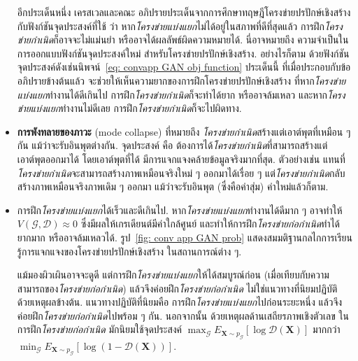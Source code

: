 \begin{itemize}
อีกประเด็นหนึ่ง 
เครสเวลและคณะ\cite{OverviewGAN2018} อภิปรายประเด็นจากการศึกษาทฤษฎีโครงข่ายปรปักษ์เชิงสร้าง\cite{GoodfellowEtAl2014a}
กับฟังก์ชันจุดประสงค์ที่ใช้
ว่า หาก\textit{โครงข่ายแบ่งแยก}ไม่ได้อยู่ในสภาพที่ดีที่สุดแล้ว การฝึก\textit{โครงข่ายกำเนิด}ก็อาจจะไม่แม่นยำ หรืออาจได้ผลลัพธ์ผิดความหมายได้.
นี่อาจหมายถึง ความจำเป็นในการออกแบบฟังก์ชันจุดประสงค์ใหม่ สำหรับโครงข่ายปรปักษ์เชิงสร้าง.
อย่างไรก็ตาม ด้วยฟังก์ชันจุดประสงค์ดังเช่นนิพจน์~\ref{eq: convapp GAN obj function}
ประเด็นนี้ ที่เมื่อประกอบกับข้ออภิปรายข้างต้นแล้ว จะช่วยให้เห็นความยากของการฝึกโครงข่ายปรปักษ์เชิงสร้าง
ที่หาก\textit{โครงข่ายแบ่งแยก}ทำงานได้ดีเกินไป การฝึก\textit{โครงข่ายกำเนิด}ก็จะทำได้ยาก หรืออาจล้มเหลว
และหาก\textit{โครงข่ายแบ่งแยก}ทำงานไม่ดีเลย การฝึก\textit{โครงข่ายกำเนิด}ก็จะไปผิดทาง.



\item \textbf{การพังทลายของภาวะ} (mode collapse\cite{SalimansEtAl2016})
ที่หมายถึง \textit{โครงข่ายกำเนิด}สร้างแต่เอาต์พุตที่เหมือน ๆ กัน แม้ว่าจะรับอินพุตต่างกัน.
จุดประสงค์ คือ ต้องการได้\textit{โครงข่ายกำเนิด}ที่สามารถสร้างแต่เอาต์พุตออกมาได้ โดยเอาต์พุตที่ได้ มีการแจกแจงคล้ายข้อมูลจริงมากที่สุด.
ตัวอย่างเช่น แทนที่\textit{โครงข่ายกำเนิด}จะสามารถสร้างภาพเหมือนจริงใหม่ ๆ ออกมาได้เรื่อย ๆ
แต่\textit{โครงข่ายกำเนิด}กลับสร้างภาพเหมือนจริงภาพเดิม ๆ ออกมา แม้ว่าจะรับอินพุต (ซึ่งคือค่าสุ่ม) ค่าใหม่แล้วก็ตาม.

\item การฝึก\textit{โครงข่ายแบ่งแยก}ได้เร็วและดีเกินไป\cite{OverviewGAN2018}.
หาก\textit{โครงข่ายแบ่งแยก}ทำงานได้ดีมาก ๆ อาจทำให้ $V(\mathcal{G}, \mathcal{D}) \approx 0$
ซึ่งมีผลให้เกรเดียนต์มีค่าใกล้ศูนย์ และทำให้การฝึก\textit{โครงข่ายก่อกำเนิด}ทำได้ยากมาก หรืออาจล้มเหลวได้.
รูป~\ref{fig: conv app GAN prob} แสดงสมมติฐานกลไกการเรียนรู้การแจกแจงของโครงข่ายปรปักษ์เชิงสร้าง ในสถานการณ์ต่าง ๆ.

แม้มองผิวเผินอาจจะดูดี
แต่การฝึก\textit{โครงข่ายแบ่งแยก}ให้ได้สมบูรณ์ก่อน (เมื่อเทียบกับความสามารถของ\textit{โครงข่ายก่อกำเนิด})
แล้วจึงค่อยฝึก\textit{โครงข่ายก่อกำเนิด}
ไม่ใช่แนวทางที่นิยมปฏิบัติ ด้วยเหตุผลข้างต้น. 
แนวทางปฏิบัติที่นิยมคือ การฝึก\textit{โครงข่ายแบ่งแยก}ไปก่อนระยะหนึ่ง 
แล้วจึงค่อยฝึก\textit{โครงข่ายก่อกำเนิด}ไปพร้อม ๆ กัน.
นอกจากนั้น ด้วยเหตุผลด้านเสถียรภาพเชิงตัวเลข ในการฝึก\textit{โครงข่ายก่อกำเนิด} มักนิยมใช้จุดประสงค์ $\max_{\mathcal{G}} E_{\bm{X} \sim p_{\mathcal{G}}} [\log \mathcal{D}(\bm{X})]$ มากกว่า $\min_{\mathcal{G}} E_{\bm{X} \sim p_{\mathcal{G}}} [\log(1 - \mathcal{D}(\bm{X}))]$.

\end{itemize}

